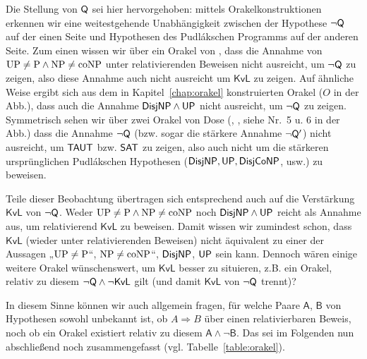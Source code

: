 Die Stellung von $\mathsf{Q}$ sei hier hervorgehoben: mittels Orakelkonstruktionen erkennen wir eine weitestgehende Unabhängigkeit zwischen der Hypothese $\neg\mathsf{Q}$ auf der einen Seite und Hypothesen des Pudlákschen Programms auf der anderen Seite. Zum einen wissen wir über ein Orakel von \textcite[Thm.~12.3, Nr.~8 in der Abb.]{fenner_inverting_2003}, dass die Annahme von $\mathrm{UP}\neq\mathrm{P}\land \mathrm{NP}\neq\mathrm{coNP}$ unter relativierenden Beweisen nicht ausreicht, um $\neg\mathsf{Q}$ zu zeigen, also diese Annahme auch nicht ausreicht um $\mathsf{KvL}$ zu zeigen.
Auf ähnliche Weise ergibt sich aus dem in Kapitel~\ref{chap:orakel} konstruierten Orakel ($O$ in der Abb.), dass auch die Annahme $\mathsf{DisjNP}\land\mathsf{UP}$ nicht ausreicht, um $\neg\mathsf{Q}$ zu zeigen.
Symmetrisch sehen wir über zwei Orakel von Dose (\cite*[Cor.~3.3]{dose_oracle_2020}, \cite*[Thm.~3.2]{dose_further_2020}, siehe Nr.~5 u. 6 in der Abb.) dass die Annahme $\neg\mathsf{Q}$ (bzw. sogar die stärkere Annahme $\neg\mathsf{Q}'$) nicht ausreicht, um $\mathsf{TAUT}$ bzw. $\mathsf{SAT}$ zu zeigen, also auch nicht um die stärkeren ursprünglichen Pudlákschen Hypothesen ($\mathsf{DisjNP}, \mathsf{UP}, \mathsf{DisjCoNP}$, usw.) zu beweisen.



Teile dieser Beobachtung übertragen sich entsprechend auch auf die Verstärkung $\mathsf{KvL}$ von $\neg\mathsf{Q}$. Weder $\mathrm{UP}\neq\mathrm{P}\land \mathrm{NP}\neq\mathrm{coNP}$ noch $\mathsf{DisjNP}\land\mathsf{UP}$ reicht als Annahme aus, um relativierend $\mathsf{KvL}$ zu beweisen.
Damit wissen wir zumindest schon, dass $\mathsf{KvL}$ (wieder unter relativierenden Beweisen) nicht äquivalent zu einer der Aussagen „$\mathrm{UP}\neq \mathrm{P}$“, $\mathrm{NP}\neq\mathrm{coNP}$“, $\mathsf{DisjNP}$, $\mathsf{UP}$ sein kann. 
Dennoch wären einige weitere Orakel wünschenswert, um $\mathsf{KvL}$ besser zu situieren, z.B. ein Orakel, relativ zu diesem $\neg\mathsf{Q} \land \neg\mathsf{KvL}$  gilt (und damit $\mathsf{KvL}$ von $\neg\mathsf{Q}$ trennt)? 

In diesem Sinne können wir auch allgemein fragen, für welche Paare $\mathsf{A}$, $\mathsf{B}$ von Hypothesen sowohl unbekannt ist, ob $A\Rightarrow B$ über einen relativierbaren Beweis, noch ob ein Orakel existiert relativ zu diesem $\mathsf{A\land \neg B}$.
Das sei im Folgenden nun abschließend noch zusammengefasst (vgl. Tabelle~\ref{table:orakel}).


